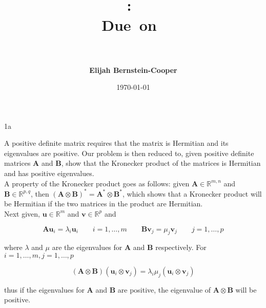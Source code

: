 \documentclass[11pt]{article}
\title{\vspace{0in}
    \textmd{\textbf{\hmwkClass:\ \hmwkTitle}}\\
    \normalsize\vspace{0.1in}\small{Due\ on\ \hmwkDueDate}\\
    \vspace{0.1in}\large{\textit{\hmwkClassInstructor\ \hmwkClassTime}}
    \vspace{0.2in}}
\author{\textbf{Elijah Bernstein-Cooper}}
\date{\today} %
\begin{document}
\maketitle

\begin{homeworkProblem}

    \begin{homeworkSection}{1a}

        A positive definite matrix requires that the matrix is Hermitian and
        its eigenvalues are positive. Our problem is then reduced to, given
        positive definite matrices $\bm{A}$ and $\bm{B}$, show that the
        Kronecker product of the matrices is Hermitian and has positive
        eigenvalues.\\

        A property of the Kronecker product goes as follows: given $\bm{A} \in
        \mathbb{R}^{m,n}$ and $\bm{B} \in \mathbb{R}^{p,q}$, then $(\bm{A}
        \otimes \bm{B})^* = \bm{A}^* \otimes \bm{B}^*$, which shows that a
        Kronecker product will be Hermitian if the two matrices in the product
        are Hermitian.\\

        Next given, $\bm{u} \in \mathbb{R}^m$ and $\bm{v} \in \mathbb{R}^p$
        and     

        \begin{equation*}
            \bm{Au}_i = \lambda_i \bm{u}_i \qquad i = 1, \dots, m \qquad 
            \bm{Bv}_j = \mu_j \bm{v}_j \qquad j = 1, \dots, p 
        \end{equation*}

        \noindent where $\lambda$ and $\mu$ are the eigenvalues for $\bm{A}$
        and $\bm{B}$ respectively. For $i = 1, \dots, m, j = 1, \dots, p$

        \begin{equation*}
            (\bm{A} \otimes \bm{B})(\bm{u}_i \otimes \bm{v}_j) = 
            \lambda_i \mu_j (\bm{u}_i \otimes \bm{v}_j)
        \end{equation*}

        \noindent thus if the eigenvalues for $\bm{A}$ and $\bm{B}$ are
        positive, the eigenvalue of $\bm{A} \otimes \bm{B}$ will be positive.\\


\end{homeworkSection}
\end{homeworkProblem}
\end{document}
